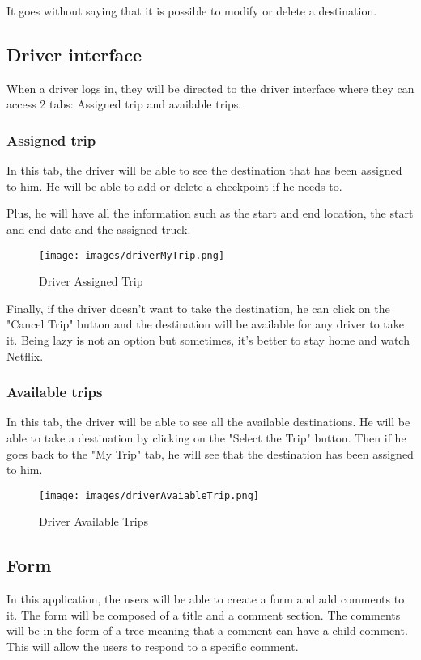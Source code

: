 \documentclass{article}
\begin{document}
It goes without saying that it is possible to modify or delete a destination.

\subsection{Driver interface}
When a driver logs in, they will be directed to the driver interface where they can access
2 tabs: Assigned trip and available trips.

\subsubsection{Assigned trip}
In this tab, the driver will be able to see the destination that has been assigned to him.
He will be able to add or delete a checkpoint if he needs to. 

Plus, he will have all the information such as the start and end location, the start and end date
and the assigned truck.

\begin{figure}[h]
    \centering
    \texttt{[image: images/driverMyTrip.png]}
    \caption{Driver Assigned Trip}
\end{figure}

Finally, if the driver doesn't want to take the destination, he can click on the "Cancel Trip"
button and the destination will be available for any driver to take it. Being lazy is not
an option but sometimes, it's better to stay home and watch Netflix.
\newpage

\subsubsection{Available trips}
In this tab, the driver will be able to see all the available destinations. He will be able
to take a destination by clicking on the "Select the Trip" button. Then if he goes back to the
"My Trip" tab, he will see that the destination has been assigned to him.

\begin{figure}[h]
    \centering
    \texttt{[image: images/driverAvaiableTrip.png]}
    \caption{Driver Available Trips}
\end{figure}

\subsection{Form}
In this application, the users will be able to create a form and add comments to it. The form
will be composed of a title and a comment section. The comments will be in the form of a tree
meaning that a comment can have a child comment. This will allow the users to respond to 
a specific comment.
\end{document}
